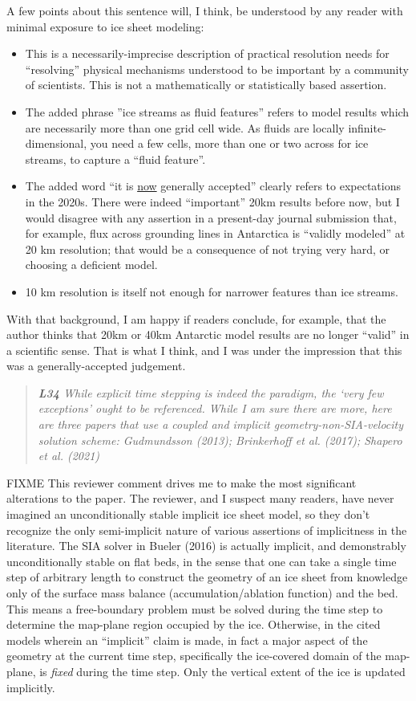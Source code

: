 \documentclass[letterpaper,final,12pt,reqno]{amsart}
\newenvironment{review}%
{\bigskip \par \begin{quote} \selectfont \sl}%
{\end{quote}}
\begin{document}
\noindent A few points about this sentence will, I think, be understood by any reader with minimal exposure to ice sheet modeling:
\begin{itemize}
\item This is a necessarily-imprecise description of practical resolution needs for ``resolving'' physical mechanisms understood to be important by a community of scientists.  This is not a mathematically or statistically based assertion.
\item The added phrase ''ice streams as fluid features'' refers to model results which are necessarily more than one grid cell wide.  As fluids are locally infinite-dimensional, you need a few cells, more than one or two across for ice streams, to capture a ``fluid feature''.
\item The added word ``it is \underline{now} generally accepted'' clearly refers to expectations in the 2020s.  There were indeed ``important'' 20km results before now, but I would disagree with any assertion in a present-day journal submission that, for example, flux across grounding lines in Antarctica is ``validly modeled'' at 20 km resolution; that would be a consequence of not trying very hard, or choosing a deficient model.
\item 10 km resolution is itself not enough for narrower features than ice streams.
\end{itemize}
With that background, I am happy if readers conclude, for example, that the author thinks that 20km or 40km Antarctic model results are no longer ``valid'' in a scientific sense.  That is what I think, and I was under the impression that this was a generally-accepted judgement.

\begin{review}
\textbf{L34}  While explicit time stepping is indeed the paradigm, the ‘very few exceptions’ ought to be referenced. While I am sure there are more, here are three papers that use a coupled and implicit geometry-non-SIA-velocity solution scheme: Gudmundsson (2013); Brinkerhoff et al. (2017); Shapero et al. (2021)
\end{review}

\noindent FIXME This reviewer comment drives me to make the most significant alterations to the paper.  The reviewer, and I suspect many readers, have never imagined an unconditionally stable implicit ice sheet model, so they don't recognize the only semi-implicit nature of various assertions of implicitness in the literature.  The SIA solver in Bueler (2016) is actually implicit, and demonstrably unconditionally stable on flat beds, in the sense that one can take a single time step of arbitrary length to construct the geometry of an ice sheet from knowledge only of the surface mass balance (accumulation/ablation function) and the bed.  This means a free-boundary problem must be solved during the time step to determine the map-plane region occupied by the ice.  Otherwise, in the cited models wherein an ``implicit'' claim is made, in fact a major aspect of the geometry at the current time step, specifically the ice-covered domain of the map-plane, is \emph{fixed} during the time step.  Only the vertical extent of the ice is updated implicitly.
\end{document}
